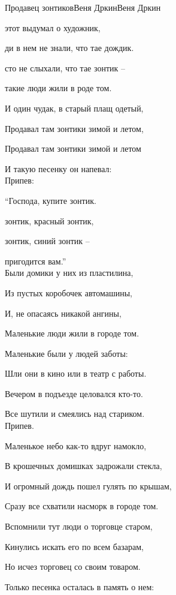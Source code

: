 \documentclass[11pt,a5paper]{book}
\newcommand{\SBChorusTagg}{Припев}
\renewcommand{\tt}{\indent \indent}
\begin{document}
\begin{song}{Продавец зонтиков}{}{Веня Дркин}{Веня Дркин}{}{}

 этот выдумал о художник,\par
{}ди в нем не знали, что тае дождик.\par
{}сто не слыхали, что тае зонтик –\par
{} такие люди жили в роде том.\par
И один чудак, в старый плащ одетый,\par
Продавал там зонтики зимой и летом,\par
Продавал там зонтики зимой и летом\par
И такую песенку он напевал:\\

\SBChorusTagg:\par
\tt“Господа, купите зонтик.\par
{} зонтик, красный зонтик,\par
{} зонтик, синий зонтик –\par
{} пригодится вам.”\\

Были домики у них из пластилина,\par
Из пустых коробочек автомашины,\par
И, не опасаясь никакой ангины,\par
Маленькие люди жили в городе том.\par
Маленькие были у людей заботы:\par
Шли они в кино или в театр с работы.\par
Вечером в подъезде целовался кто-то.\par
Все шутили и смеялись над стариком.\\


\SBChorusTagg.\\

\newpage

Маленькое небо как-то вдруг намокло,\par
В крошечных домишках задрожали стекла,\par
И огромный дождь пошел гулять по крышам,\par
Сразу все схватили насморк в городе том.\par
Вспомнили тут люди о торговце старом,\par
Кинулись искать его по всем базарам,\par
Но исчез торговец со своим товаром.\par
Только песенка осталась в память о нем:\\


\end{song}
\end{document}
